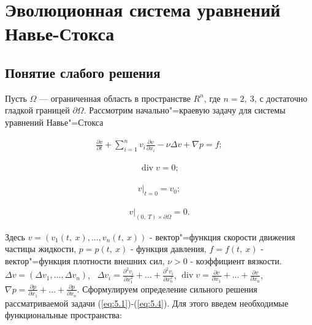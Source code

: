 \section{Эволюционная система уравнений \\Навье-Стокса}
\subsection {Понятие слабого решения}
Пусть $\Omega$ --- ограниченная область в пространстве $R^n$, где $n=2, \ 3$, с достаточно гладкой границей $\partial\Omega$.
Рассмотрим начально"=краевую задачу для системы уравнений Навье"=Стокса

\begin{equation}\label{eq:5.1}
    \begin{gathered}
        \frac{\partial v}{\partial t}+\sum_{i=1}^nv_i\frac{\partial v}{\partial x_i}-\nu\Delta v+\nabla p=f;
    \end{gathered}
\end{equation}

\begin{equation}\label{eq:5.2}
    \begin{gathered}
        \operatorname{div} v=0;
    \end{gathered}
\end{equation}

\begin{equation}\label{eq:5.3}
    \begin{gathered}
        v|_{t=0}=v_0;
    \end{gathered}
\end{equation}

\begin{equation}\label{eq:5.4}
    \begin{gathered}
        v|_{(0, \ T)\times\partial\Omega}=0.
    \end{gathered}
\end{equation}

Здесь $v=(v_1(t, \ x),...,v_n(t, \ x))$ - вектор"=функция скорости движения частицы жидкости, $p=p(t, \ x)$ - функция давления,
$f=f(t, \ x)$ - вектор"=функция плотности внешних сил, $\nu>0$ - коэффициент вязкости.
$\Delta v=(\Delta v_1,...,\Delta v_n)$, \ $\Delta v_i= \frac{\partial^2 v_i}{\partial x_1^2}+...+\frac{\partial^2 v_i}{\partial x_n^2}$,
$\operatorname{div} v= \frac{\partial v}{\partial x_1}+...+\frac{\partial v}{\partial x_n}$,
$\nabla p=\frac{\partial p}{\partial x_1}+...+\frac{\partial p}{\partial x_n}$.
Сформулируем определение сильного решения рассматриваемой задачи (\ref{eq:5.1})-(\ref{eq:5.4}).
Для этого введем необходимые функциональные пространства:

